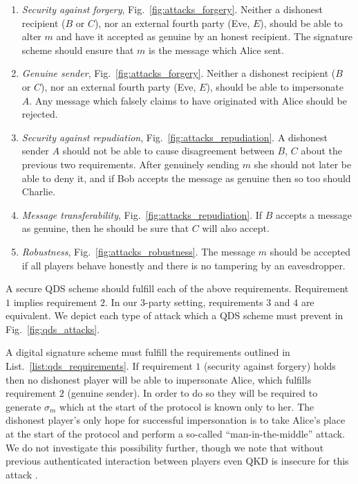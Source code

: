 \begin{mylist}[htp]
\captionsetup{width=0.8\linewidth}
\begin{framed}
\begin{enumerate}
\item\emph{Security against forgery}, Fig.~\ref{fig:attacks_forgery}. Neither a dishonest recipient ($B$ or $C$), nor an external fourth party (Eve, $E$), should be able to alter $m$ and have it accepted as genuine by an honest recipient. The signature scheme should ensure that $m$ is the message which Alice sent.

\item\emph{Genuine sender}, Fig.~\ref{fig:attacks_forgery}. Neither a dishonest recipient ($B$ or $C$), nor an external fourth party (Eve, $E$), should be able to impersonate $A$. Any message which falsely claims to have originated with Alice should be rejected.

\item\emph{Security against repudiation}, Fig.~\ref{fig:attacks_repudiation}. A dishonest sender $A$ should not be able to cause disagreement between $B$, $C$ about the previous two requirements. After genuinely sending $m$ she should not later be able to deny it, and if Bob accepts the message as genuine then so too should Charlie. 

\item \emph{Message transferability}, Fig.~\ref{fig:attacks_repudiation}. If $B$ accepts a message as genuine, then he should be sure that $C$ will also accept.

\item \emph{Robustness}, Fig.~\ref{fig:attacks_robustness}. The message $m$ should be accepted if all players behave honestly and there is no tampering by an eavesdropper.
\end{enumerate}
\caption{\label{list:qds_requirements} A secure QDS scheme should fulfill each of the above requirements. Requirement $1$ implies requirement $2$. In our $3$-party setting, requirements $3$ and $4$ are equivalent. We depict each type of attack which a QDS scheme must prevent in Fig.~\ref{fig:qds_attacks}.}
\end{framed}
\end{mylist}



A digital signature scheme must fulfill the requirements outlined in List.~\ref{list:qds_requirements}. If requirement $1$ (security against forgery) holds then no dishonest player will be able to impersonate Alice, which fulfills requirement $2$ (genuine sender). In order to do so they will be required to generate $\sigma_m$ which at the start of the protocol is known only to her. The dishonest player's only hope for successful impersonation is to take Alice's place at the start of the protocol and perform a so-called ``man-in-the-middle'' attack. We do not investigate this possibility further, though we note that without previous authenticated interaction between players even QKD is insecure for this attack \cite{Broadbent2015}.


